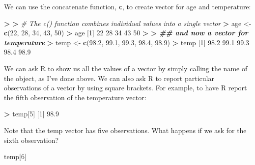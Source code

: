 \documentclass[
]{book}
\newenvironment{Shaded}{\begin{snugshade}}{\end{snugshade}}
\newcommand{\CommentTok}[1]{\textcolor[rgb]{0.56,0.35,0.01}{\textit{#1}}}
\newcommand{\DecValTok}[1]{\textcolor[rgb]{0.00,0.00,0.81}{#1}}
\newcommand{\DocumentationTok}[1]{\textcolor[rgb]{0.56,0.35,0.01}{\textbf{\textit{#1}}}}
\newcommand{\ErrorTok}[1]{\textcolor[rgb]{0.64,0.00,0.00}{\textbf{#1}}}
\newcommand{\FloatTok}[1]{\textcolor[rgb]{0.00,0.00,0.81}{#1}}
\newcommand{\FunctionTok}[1]{\textcolor[rgb]{0.13,0.29,0.53}{\textbf{#1}}}
\newcommand{\NormalTok}[1]{#1}
\newcommand{\OtherTok}[1]{\textcolor[rgb]{0.56,0.35,0.01}{#1}}
\newcommand{\SpecialCharTok}[1]{\textcolor[rgb]{0.81,0.36,0.00}{\textbf{#1}}}
\begin{document}
We can use the concatenate function, \texttt{c}, to create vector for age and temperature:

\begin{Shaded}
\begin{Highlighting}[]
\SpecialCharTok{\textgreater{}} 
\ErrorTok{\textgreater{}} \CommentTok{\# The c() function combines individual values into a single vector}
\ErrorTok{\textgreater{}}\NormalTok{ age }\OtherTok{\textless{}{-}} \FunctionTok{c}\NormalTok{(}\DecValTok{22}\NormalTok{, }\DecValTok{28}\NormalTok{, }\DecValTok{34}\NormalTok{, }\DecValTok{43}\NormalTok{, }\DecValTok{50}\NormalTok{)}
\SpecialCharTok{\textgreater{}}\NormalTok{ age}
\NormalTok{[}\DecValTok{1}\NormalTok{] }\DecValTok{22} \DecValTok{28} \DecValTok{34} \DecValTok{43} \DecValTok{50}
\SpecialCharTok{\textgreater{}} 
\ErrorTok{\textgreater{}} \DocumentationTok{\#\# and now a vector for temperature}
\ErrorTok{\textgreater{}}\NormalTok{ temp }\OtherTok{\textless{}{-}} \FunctionTok{c}\NormalTok{(}\FloatTok{98.2}\NormalTok{, }\FloatTok{99.1}\NormalTok{, }\FloatTok{99.3}\NormalTok{, }\FloatTok{98.4}\NormalTok{, }\FloatTok{98.9}\NormalTok{)}
\SpecialCharTok{\textgreater{}}\NormalTok{ temp}
\NormalTok{[}\DecValTok{1}\NormalTok{] }\FloatTok{98.2} \FloatTok{99.1} \FloatTok{99.3} \FloatTok{98.4} \FloatTok{98.9}
\end{Highlighting}
\end{Shaded}

We can ask R to show us all the values of a vector by simply calling the name of the object, as I've done above. We can also ask R to report particular observations of a vector by using square brackets. For example, to have R report the fifth observation of the temperature vector:

\begin{Shaded}
\begin{Highlighting}[]
\SpecialCharTok{\textgreater{}}\NormalTok{ temp[}\DecValTok{5}\NormalTok{]}
\NormalTok{[}\DecValTok{1}\NormalTok{] }\FloatTok{98.9}
\end{Highlighting}
\end{Shaded}

Note that the temp vector has five observations. What happens if we ask for the sixth observation?

\begin{Shaded}
\begin{Highlighting}[]
\NormalTok{temp[}\DecValTok{6}\NormalTok{]}
\end{Highlighting}
\end{Shaded}
\end{document}
